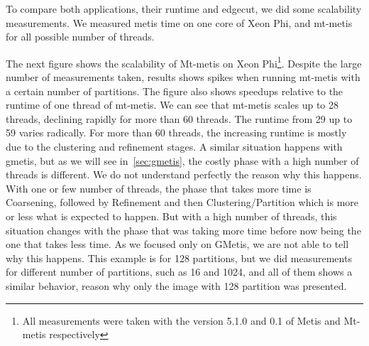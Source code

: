 \documentclass[abstract=on,9pt,twocolumn]{scrartcl}
\begin{document}



\label{sec:metis}
To compare both applications, their runtime and edgecut, we did some
scalability measurements. We measured metis time on one core of Xeon Phi, 
and mt-metis for all possible number of threads.

The next figure shows the scalability of Mt-metis on Xeon
Phi\footnote{All measurements were taken with the version 5.1.0 and 0.1
of Metis and Mt-metis respectively}. Despite
the large number of measurements taken, results shows spikes when
running mt-metis with a certain number of partitions. The figure also
shows speedups relative to the runtime of one thread of mt-metis. We can
see that mt-metis scales up to 28 threads, declining rapidly for more
than 60 threads. The runtime from 29 up to 59 varies radically. For more
than 60 threads, the increasing runtime is mostly due to the clustering
and refinement stages. A similar situation happens with gmetis, but as
we will see in~\ref{sec:gmetis}, the costly phase with a high number of
threads is different. 
We do not understand perfectly the reason why this happens. With one or
few number of threads, the phase that takes more time is Coarsening,
followed by Refinement and then Clustering/Partition which is more or
less what is expected to happen. But with a high number of threads, this
situation changes with the phase that was taking more time before now
being the one that takes less time. As we focused only on GMetis, we are
not able to tell why this happens.
This example is for 128 partitions, but we did
measurements for different number of partitions, such as 16 and 1024,
and all of them shows a similar behavior, reason why only the image
with 128 partition was presented.
\end{document}
